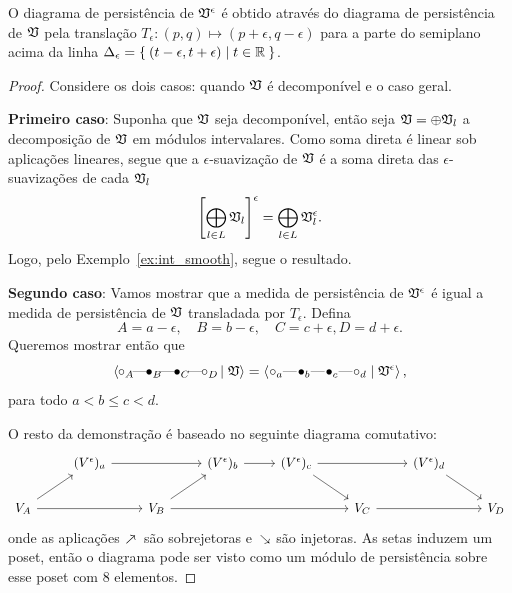 \begin{propo}\label{teo:shiftdgm}
    O diagrama de persistência de $\mathfrak{V}^\epsilon$ é obtido através do diagrama
    de persistência de $\mathfrak{V}$ pela translação $T_\epsilon \colon (p,q) \mapsto
    (p+\epsilon, q-\epsilon)$ para a parte do semiplano acima da linha 
    $\Delta_\epsilon = \Set{(t-\epsilon, t+\epsilon) | t \in \mathbb{R}}$. 
\end{propo}
\begin{proof}
Considere os dois casos: quando $\mathfrak{V}$ é decomponível e o caso geral.

\textbf{Primeiro caso}: Suponha que $\mathfrak{V}$ seja decomponível, então seja
$\mathfrak{V} = \oplus \mathfrak{V}_l$ a decomposição de $\mathfrak{V}$ em módulos intervalares. 
Como soma direta é linear sob aplicações lineares, segue que a $\epsilon$-suavização
de $\mathfrak{V}$ é a soma direta das $\epsilon$-suavizações de cada $\mathfrak{V}_l$
\begin{equation*}
    \left[ \bigoplus_{l\in L} \mathfrak{V}_l  \right]^\epsilon = \bigoplus_{l \in L} \mathfrak{V}_l^\epsilon.
\end{equation*}
Logo, pelo Exemplo~\ref{ex:int_smooth}, segue o resultado.

\textbf{Segundo caso}: Vamos mostrar que a medida de persistência de $\mathfrak{V}^\epsilon$ é igual a medida
de persistência de $\mathfrak{V}$ transladada por $T_\epsilon$. Defina
\begin{equation*}
    A = a-\epsilon, \quad B = b-\epsilon, \quad C =c+\epsilon, D=d+\epsilon.
\end{equation*}
Queremos mostrar então que
\begin{equation*}
    \innerproduct{\qoff{A} \qem \qon{B} \qem \qon{C} \qem \qoff{D} \mid \frakv} = 
    \innerproduct{\qoff{a} \qem \qon{b} \qem \qon{c} \qem \qoff{d} \mid \frakv^\epsilon}, 
\end{equation*}
para todo $a < b \leq c < d$. 

O resto da demonstração é baseado no seguinte diagrama comutativo:
\begin{equation*}
    \begin{tikzcd}
    & (V^\epsilon)_a \arrow[rr] &   & (V^\epsilon)_b \arrow[r] & (V^\epsilon)_c \arrow[rr] \arrow[rd] &    & (V^\epsilon)_d \arrow[rd] &     \\
    V_A \arrow[ru] \arrow[rr]   &   & V_B \arrow[ru] \arrow[rrr] &    &    & V_C \arrow[rr] &  & V_D  
    \end{tikzcd}
\end{equation*}
onde as aplicações $\surjarrow$ são sobrejetoras e $\injarrow$ são injetoras. As setas 
induzem um poset, então o diagrama pode ser visto como um módulo de persistência sobre
esse poset com $8$ elementos. 


\end{proof}
